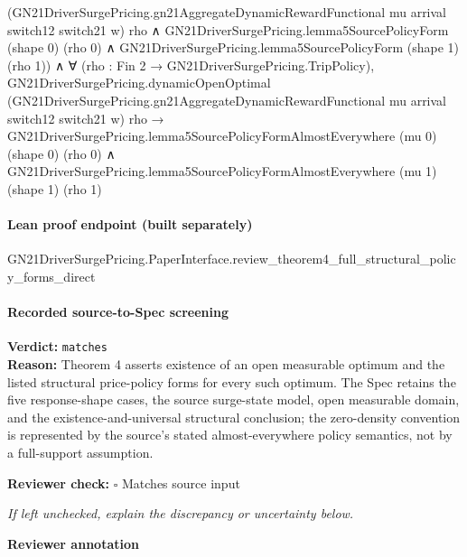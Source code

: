 \documentclass[10pt]{article}
\newcommand{\reviewerbox}{%
  \par\noindent\fbox{\parbox{0.96\linewidth}{\rule{0pt}{0.38in}}}\par
}
\newcommand{\reviewmatch}[1]{%
  \par\noindent\textbf{Reviewer check:} $\square$\; #1\par
  \noindent\emph{If left unchecked, explain the discrepancy or uncertainty below.}\par
}
\begin{document}
\begin{ReviewVerbatim}
                                      (GN21DriverSurgePricing.gn21AggregateDynamicRewardFunctional mu arrival switch12
                                        switch21 w)
                                      rho ∧
                                    GN21DriverSurgePricing.lemma5SourcePolicyForm (shape 0) (rho 0) ∧
                                      GN21DriverSurgePricing.lemma5SourcePolicyForm (shape 1) (rho 1)) ∧
                                ∀ (rho : Fin 2 → GN21DriverSurgePricing.TripPolicy),
                                  GN21DriverSurgePricing.dynamicOpenOptimal
                                      (GN21DriverSurgePricing.gn21AggregateDynamicRewardFunctional mu arrival switch12
                                        switch21 w)
                                      rho →
                                    GN21DriverSurgePricing.lemma5SourcePolicyFormAlmostEverywhere (mu 0) (shape 0)
                                        (rho 0) ∧
                                      GN21DriverSurgePricing.lemma5SourcePolicyFormAlmostEverywhere (mu 1) (shape 1)
                                        (rho 1)
\end{ReviewVerbatim}

\paragraph{Lean proof endpoint (built separately)}\begin{ReviewVerbatim}
GN21DriverSurgePricing.PaperInterface.review_theorem4_full_structural_policy_forms_direct
\end{ReviewVerbatim}

\paragraph{Recorded source-to-Spec screening}
\textbf{Verdict:} \texttt{matches}
\\
\textbf{Reason:} Theorem 4 asserts existence of an open measurable optimum and the listed structural price-policy forms for every such optimum. The Spec retains the five response-shape cases, the source surge-state model, open measurable domain, and the existence-and-universal structural conclusion; the zero-density convention is represented by the source's stated almost-everywhere policy semantics, not by a full-support assumption.
\reviewmatch{Matches source input}
\noindent\textbf{Reviewer annotation}\par
\reviewerbox
\clearpage
\hypertarget{source-claim-e4ff38b469e6cc30}{}
\hypertarget{source-section-62736bb95a656bbc}{}
\end{document}

